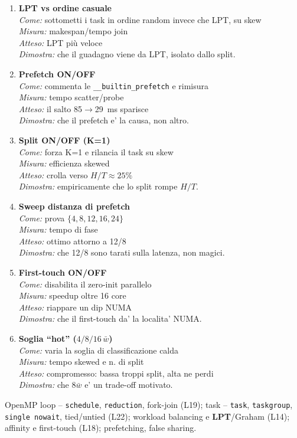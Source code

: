 \documentclass[11pt,a4paper]{article}
\newcommand{\espitem}[5]{\item \textbf{#1}\\ \emph{Come:} #2\\ \emph{Misura:} #3\\ \emph{Atteso:} #4\\ \emph{Dimostra:} #5}
\begin{document}
\begin{espbox}
\begin{enumerate}[leftmargin=1.3em]
\espitem{LPT vs ordine casuale}{sottometti i task in ordine random invece che LPT, su skew}{makespan/tempo join}
  {LPT più veloce}{che il guadagno viene da LPT, isolato dallo split.}
\espitem{Prefetch ON/OFF}{commenta le \texttt{\_\_builtin\_prefetch} e rimisura}{tempo scatter/probe}{il salto 85$\to$29~ms sparisce}
  {che il prefetch e' la causa, non altro.}
\espitem{Split ON/OFF (K=1)}{forza K=1 e rilancia il task su skew}{efficienza skewed}{crolla verso $H/T\approx25\%$}
  {empiricamente che lo split rompe $H/T$.}
\espitem{Sweep distanza di prefetch}{prova $\{4,8,12,16,24\}$}{tempo di fase}{ottimo attorno a 12/8}
  {che 12/8 sono tarati sulla latenza, non magici.}
\espitem{First-touch ON/OFF}{disabilita il zero-init parallelo}{speedup oltre 16 core}{riappare un dip NUMA}
  {che il first-touch da' la localita' NUMA.}
\espitem{Soglia ``hot'' ($4/8/16\,\bar w$)}{varia la soglia di classificazione calda}{tempo skewed e n. di split}
  {compromesso: bassa troppi split, alta ne perdi}{che $8\bar w$ e' un trade-off motivato.}
\end{enumerate}
\end{espbox}

\begin{theorybox}
OpenMP loop -- \texttt{schedule}, \texttt{reduction}, fork-join (L19); task -- \texttt{task}, \texttt{taskgroup}, \texttt{single nowait}, tied/untied (L22); workload balancing e \textbf{LPT}/Graham (L14); affinity e first-touch (L18); prefetching, false sharing.
\end{theorybox}
\end{document}
